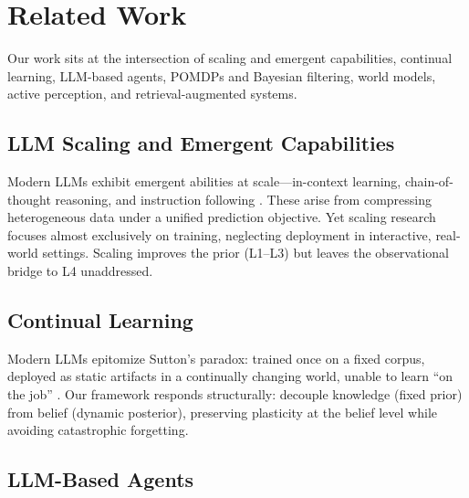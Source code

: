 \section{Related Work}

Our work sits at the intersection of scaling and emergent capabilities, continual learning, LLM-based agents, POMDPs and Bayesian filtering, world models, active perception, and retrieval-augmented systems.

\subsection{LLM Scaling and Emergent Capabilities}

Modern LLMs exhibit emergent abilities at scale---in-context learning, chain-of-thought reasoning, and instruction following \citep{wei2022emergent,brown2020language,schaeffer2023are}. These arise from compressing heterogeneous data under a unified prediction objective. Yet scaling research focuses almost exclusively on training, neglecting deployment in interactive, real-world settings. Scaling improves the prior (L1--L3) but leaves the observational bridge to L4 unaddressed.

\subsection{Continual Learning}

Modern LLMs epitomize Sutton's paradox: trained once on a fixed corpus, deployed as static artifacts in a continually changing world, unable to learn ``on the job'' \citep{sutton2022plasticity,patel2025sutton}. Our framework responds structurally: decouple knowledge (fixed prior) from belief (dynamic posterior), preserving plasticity at the belief level while avoiding catastrophic forgetting.

\subsection{LLM-Based Agents}

